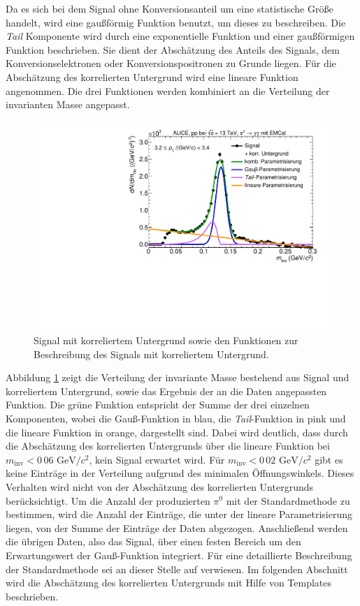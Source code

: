Da es sich bei dem Signal ohne Konversionsanteil um eine statistische Größe handelt, wird eine gaußförmig Funktion benutzt, um dieses zu beschreiben.
\newline
Die \textit{Tail} Komponente wird durch eine exponentielle Funktion und einer gaußförmigen Funktion beschrieben.
Sie dient der Abschätzung des Anteils des Signals, dem Konversionselektronen oder Konversionspositronen zu Grunde liegen.
Für die Abschätzung des korrelierten Untergrund wird eine lineare Funktion angenommen.
Die drei Funktionen werden kombiniert an die Verteilung der invarianten Masse angepasst.
\begin{figure}[tp]
\centering
\includegraphics[width=.75\linewidth]{StandardParam.pdf}
\caption{Signal mit korreliertem Untergrund sowie den Funktionen zur Beschreibung des Signals mit korreliertem Untergrund.}
\label{figStandardParam}
\end{figure}
\newline
Abbildung \ref{figStandardParam} zeigt die Verteilung der invariante Masse bestehend aus Signal und korreliertem Untergrund, sowie das Ergebnis der an die Daten angepassten Funktion.
Die grüne Funktion entspricht der Summe der drei einzelnen Komponenten, wobei die Gauß-Funktion in blau, die \textit{Tail}-Funktion in pink und die lineare Funktion in orange, dargestellt sind.
Dabei wird deutlich, dass durch die Abschätzung des korrelierten Untergrunds über die lineare Funktion bei $m_\text{inv} < 0\,06\text{ GeV}/c^{2}$, kein Signal erwartet wird.
Für $m_\text{inv} < 0\,02\text{ GeV}/c^{2}$ gibt es keine Einträge in der Verteilung aufgrund des minimalen Öffnungswinkels.
Dieses Verhalten wird nicht von der Abschätzung des korrelierten Untergrunds berücksichtigt.
\newline
Um die Anzahl der produzierten $\pi^{0}$ mit der Standardmethode zu bestimmen, wird die Anzahl der Einträge, die unter der lineare Parametrisierung liegen, von der Summe der Einträge der Daten abgezogen.
Anschließend werden die übrigen Daten, also das Signal, über einen festen Bereich um den Erwartungswert der Gauß-Funktion integriert.
Für eine detaillierte Beschreibung der Standardmethode sei an dieser Stelle auf \cite{thesis:Adrian} verwiesen.
\newline
Im folgenden Abschnitt wird die Abschätzung des korrelierten Untergrunds mit Hilfe von Templates beschrieben.